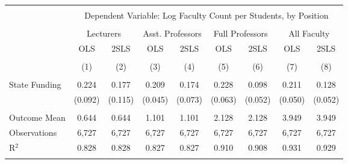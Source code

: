 
\begin{tabular}{@{\extracolsep{5pt}}lcccccccc} 
\\[-1.8ex]\hline 
\hline \\[-1.8ex] 
 & \multicolumn{8}{c}{Dependent Variable: Log Faculty Count per Students, by Position} \\ 
\cline{2-9} 
\\[-1.8ex] & \multicolumn{2}{c}{Lecturers} & \multicolumn{2}{c}{Asst. Professors} & \multicolumn{2}{c}{Full Professors} & \multicolumn{2}{c}{All Faculty} \\ 
 & OLS & 2SLS & OLS & 2SLS & OLS & 2SLS & OLS & 2SLS \\ 
\\[-1.8ex] & (1) & (2) & (3) & (4) & (5) & (6) & (7) & (8)\\ 
\hline \\[-1.8ex] 
 State Funding & 0.224 & 0.177 & 0.209 & 0.174 & 0.228 & 0.098 & 0.211 & 0.128 \\ 
  & (0.092) & (0.115) & (0.045) & (0.073) & (0.063) & (0.052) & (0.050) & (0.052) \\ 
 \hline \\[-1.8ex] 
Outcome Mean & 0.644 & 0.644 & 1.101 & 1.101 & 2.128 & 2.128 & 3.949 & 3.949 \\ 
Observations & 6,727 & 6,727 & 6,727 & 6,727 & 6,727 & 6,727 & 6,727 & 6,727 \\ 
R$^{2}$ & 0.828 & 0.828 & 0.827 & 0.827 & 0.910 & 0.908 & 0.931 & 0.929 \\ 
\hline 
\hline \\[-1.8ex] 
\end{tabular} 
